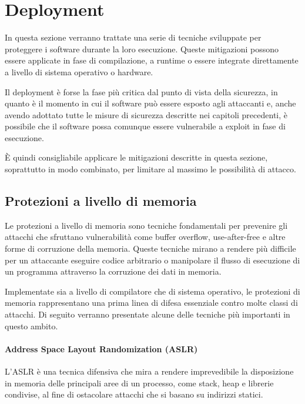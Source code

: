 \section{Deployment}
\label{sec:deployment}

In questa sezione verranno trattate una serie di tecniche sviluppate per proteggere
i software durante la loro esecuzione. Queste mitigazioni possono essere
applicate in fase di compilazione, a runtime o essere integrate direttamente a livello
di sistema operativo o hardware.

Il deployment è forse la fase più critica dal punto di vista della sicurezza, in
quanto è il momento in cui il software può essere esposto agli attaccanti e, anche
avendo adottato tutte le misure di sicurezza descritte nei capitoli precedenti,
è possibile che il software possa comunque essere vulnerabile a exploit in fase
di esecuzione.

È quindi consigliabile applicare le mitigazioni descritte in questa sezione, soprattutto
in modo combinato, per limitare al massimo le possibilità di attacco.

\subsection{Protezioni a livello di memoria}
\label{sec:memory-protection}

Le protezioni a livello di memoria sono tecniche fondamentali per prevenire gli attacchi
che sfruttano vulnerabilità come buffer overflow, use-after-free e altre forme
di corruzione della memoria. Queste tecniche mirano a rendere più difficile per un
attaccante eseguire codice arbitrario o manipolare il flusso di esecuzione di un
programma attraverso la corruzione dei dati in memoria.

Implementate sia a livello di compilatore che di sistema operativo, le
protezioni di memoria rappresentano una prima linea di difesa essenziale contro
molte classi di attacchi. Di seguito verranno presentate alcune delle tecniche più
importanti in questo ambito.

\paragraph{Address Space Layout Randomization (ASLR)}
L'ASLR è una tecnica difensiva che mira a rendere imprevedibile la disposizione
in memoria delle principali aree di un processo, come stack, heap e librerie
condivise, al fine di ostacolare attacchi che si basano su indirizzi statici.

